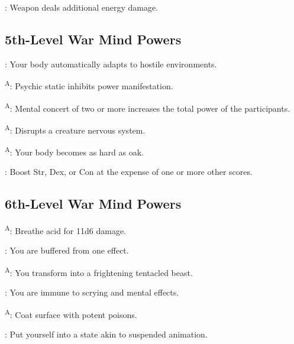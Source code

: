 : Weapon deals additional energy damage.




\subsection{5th-Level War Mind Powers}

: Your body automatically adapts to hostile environments.

\textsuperscript{A}: Psychic static inhibits power manifestation.

\textsuperscript{A}: Mental concert of two or more increases the total power of the participants.

\textsuperscript{A}: Disrupts a creature nervous system. %

\textsuperscript{A}: Your body becomes as hard as oak.

: Boost Str, Dex, or Con at the expense of one or more other scores.




\subsection{6th-Level War Mind Powers}

\textsuperscript{A}: Breathe acid for 11d6 damage.

: You are buffered from one  effect.

\textsuperscript{A}: You transform into a frightening tentacled beast.

: You are immune to scrying and mental effects.

\textsuperscript{A}: Coat surface with potent poisons. %

: Put yourself into a state akin to suspended animation.
